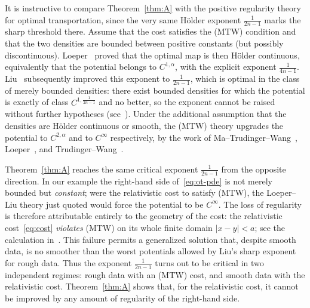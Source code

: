 \documentclass[12pt,letterpaper]{amsart}
\theoremstyle{definition}
\theoremstyle{plain}
\numberwithin{equation}{section}
\begin{document}
It is instructive to compare Theorem~\ref{thm:A} with the positive regularity theory for
optimal transportation, since the very same H\"older exponent $\frac{1}{2n-1}$ marks the
sharp threshold there.
Assume that the cost satisfies the (MTW) condition and that the two
densities are bounded between positive constants (but possibly discontinuous).
Loeper~\cite{Lo09} proved that the optimal map is then H\"older continuous, equivalently that
the potential belongs to $C^{1,\alpha}$, with the explicit exponent $\frac{1}{4n-1}$.
Liu~\cite{Liu09} subsequently improved this exponent to $\frac{1}{2n-1}$,
which is optimal in the class of merely bounded densities: there exist bounded densities for which the potential is exactly of class $C^{1,\frac{1}{2n-1}}$ and
no better, so the exponent cannot be raised without further hypotheses (see~\cite{Lo09,Liu09}).
Under the additional assumption that the densities are H\"older continuous or smooth, the (MTW)
theory upgrades the potential to $C^{2,\alpha}$ and to $C^\infty$ respectively, by the work of
Ma--Trudinger--Wang~\cite{MTW05}, Loeper~\cite{Lo09}, and Trudinger--Wang~\cite{TW09}.

Theorem~\ref{thm:A} reaches the same critical exponent $\frac{1}{2n-1}$ from the opposite
direction. In our example the right-hand side of~\eqref{eq:ot-pde} is not merely bounded but
\emph{constant}; were the relativistic cost to satisfy
(MTW), the Loeper--Liu theory just quoted would force the potential to be $C^\infty$. The loss
of regularity is therefore attributable entirely to the geometry of the cost: the relativistic
cost~\eqref{eq:cost} \emph{violates} (MTW) on its whole finite domain
$|x-y|<a$; see the calculation in~\cite[Section~6]{QZ26}. This failure permits a
generalized solution that, despite smooth data, is no smoother than the worst potentials
allowed by Liu's sharp exponent for rough data. Thus the exponent $\frac{1}{2n-1}$ turns out to
be critical in two independent regimes: rough data with an (MTW) cost, and smooth data with
the relativistic cost.
Theorem~\ref{thm:A} shows that, for the relativistic cost, it
cannot be improved by any amount of regularity of the right-hand side.
\end{document}
